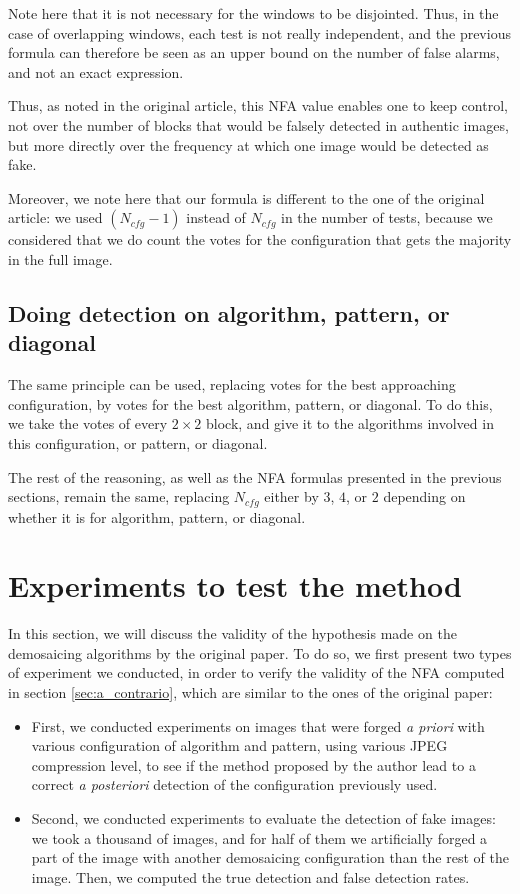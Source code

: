 \documentclass[sigconf, nonacm]{acmart}
\begin{document}
Note here that it is not necessary for the windows to be disjointed. Thus, in the case of overlapping windows, each test is not really independent, and the previous formula can therefore be seen as an upper bound on the number of false alarms, and not an exact expression.

Thus, as noted in the original article, this NFA value enables one to keep control, not over the number of blocks that would be falsely detected in authentic images, but more directly over the frequency at which one image would be detected as fake.

Moreover, we note here that our formula is different to the one of the original article: we used $(N_{cfg} - 1)$ instead of $N_{cfg}$ in the number of tests, because we considered that we do count the votes for the configuration that gets the majority in the full image.

\subsection{Doing detection on algorithm, pattern, or diagonal} The same principle can be used, replacing votes for the best approaching configuration, by votes for the best algorithm, pattern, or diagonal. To do this, we take the votes of every $2 \times 2$ block, and give it to the algorithms involved in this configuration, or pattern, or diagonal.

The rest of the reasoning, as well as the NFA formulas presented in the previous sections, remain the same, replacing $N_{cfg}$ either by $3$, $4$, or $2$ depending on whether it is for algorithm, pattern, or diagonal.

\section{Experiments to test the method}

In this section, we will discuss the validity of the hypothesis made on the demosaicing algorithms by the original paper. To do so, we first present two types of experiment we conducted, in order to verify the validity of the NFA computed in section \ref{sec:a_contrario}, which are similar to the ones of the original paper:

\begin{itemize}
    \item First, we conducted experiments on images that were forged \textit{a priori} with various configuration of algorithm and pattern, using various JPEG compression level, to see if the method proposed by the author lead to a correct \textit{a posteriori} detection of the configuration previously used.
    \item Second, we conducted experiments to evaluate the detection of fake images: we took a thousand of images, and for half of them we artificially forged a part of the image with another demosaicing configuration than the rest of the image. Then, we computed the true detection and false detection rates.
\end{itemize}
\end{document}
